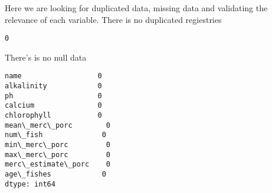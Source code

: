 \documentclass[11pt]{article}
\begin{document}
Here we are looking for duplicated data, missing data and validating the
relevance of each variable. There is no duplicated regiestries

            \begin{tcolorbox}[breakable, size=fbox, boxrule=.5pt, pad at break*=1mm, opacityfill=0]
\begin{Verbatim}[commandchars=\\\{\}]
0
\end{Verbatim}
\end{tcolorbox}
        
    There's is no null data

            \begin{tcolorbox}[breakable, size=fbox, boxrule=.5pt, pad at break*=1mm, opacityfill=0]
\begin{Verbatim}[commandchars=\\\{\}]
name                  0
alkalinity            0
ph                    0
calcium               0
chlorophyll           0
mean\_merc\_porc        0
num\_fish              0
min\_merc\_porc         0
max\_merc\_porc         0
merc\_estimate\_porc    0
age\_fishes            0
dtype: int64
\end{Verbatim}
\end{tcolorbox}
        

    
    
    
\end{document}
